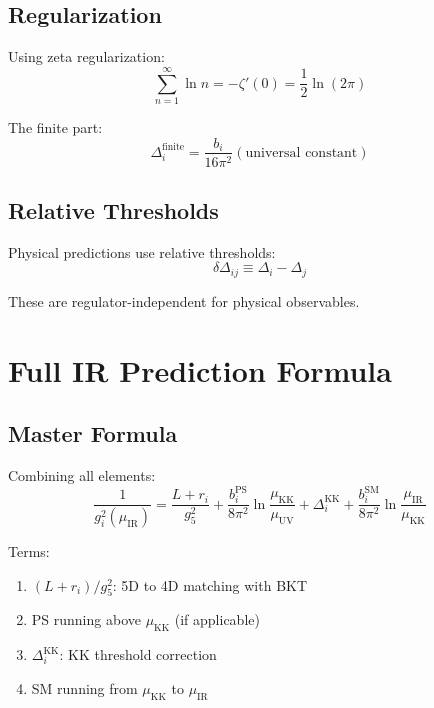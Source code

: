 \documentclass[11pt,a4paper]{article}
\begin{document}
\subsection{Regularization}
\label{subsec:regularization}

Using zeta regularization:
\begin{equation}
\label{eq:zeta-reg}
\sum_{n=1}^{\infty}\ln n = -\zeta'(0) = \frac{1}{2}\ln(2\pi)
\end{equation}

The finite part:
\begin{equation}
\label{eq:finite-threshold}
\Delta_i^{\text{finite}} = \frac{b_i}{16\pi^2}\left(\text{universal constant}\right)
\end{equation}

\subsection{Relative Thresholds}
\label{subsec:relative-thresholds}

Physical predictions use relative thresholds:
\begin{equation}
\label{eq:relative-delta}
\delta\Delta_{ij} \equiv \Delta_i - \Delta_j
\end{equation}

These are regulator-independent for physical observables.

\section{Full IR Prediction Formula}
\label{sec:full-formula}

\subsection{Master Formula}
\label{subsec:master}

Combining all elements:
\begin{equation}
\label{eq:master-formula}
\boxed{
\frac{1}{g_i^2(\mu_{\text{IR}})} = \frac{L + r_i}{g_5^2} + \frac{b_i^{\text{PS}}}{8\pi^2}\ln\frac{\mu_{\text{KK}}}{\mu_{\text{UV}}} + \Delta_i^{\text{KK}} + \frac{b_i^{\text{SM}}}{8\pi^2}\ln\frac{\mu_{\text{IR}}}{\mu_{\text{KK}}}
}
\end{equation}

Terms:
\begin{enumerate}
\item $(L + r_i)/g_5^2$: 5D to 4D matching with BKT
\item PS running above $\mu_{\text{KK}}$ (if applicable)
\item $\Delta_i^{\text{KK}}$: KK threshold correction
\item SM running from $\mu_{\text{KK}}$ to $\mu_{\text{IR}}$
\end{enumerate}
\end{document}
